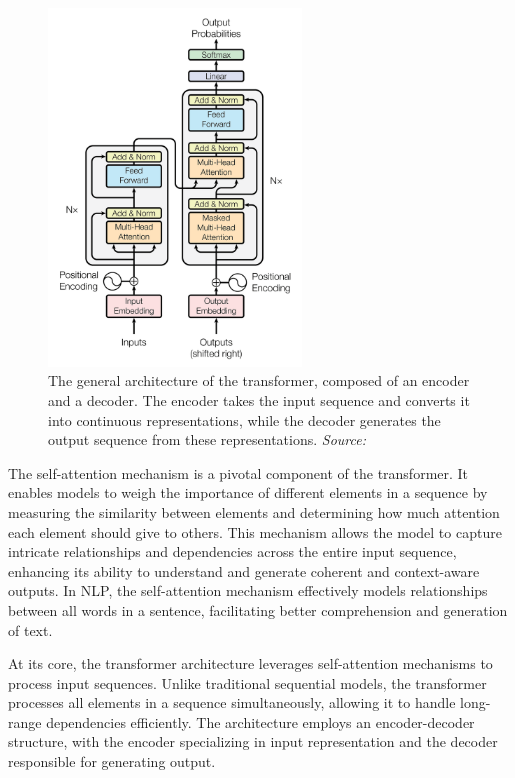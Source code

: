 \begin{figure}[h!]
    \centering
    \includegraphics[width=0.6\textwidth]{images/llms/transformer-architecture.png}
    \caption{The general architecture of the transformer, composed of an encoder and a decoder. The encoder takes the input sequence and converts it into continuous representations, while the decoder generates the output sequence from these representations. \textit{Source:} \cite{vaswani2017attention}}
    \label{fig:transformer-architecture}
\end{figure}

The self-attention mechanism is a pivotal component of the transformer. It enables models to weigh the importance of different elements in a sequence by measuring the similarity between elements and determining how much attention each element should give to others. This mechanism allows the model to capture intricate relationships and dependencies across the entire input sequence, enhancing its ability to understand and generate coherent and context-aware outputs. In NLP, the self-attention mechanism effectively models relationships between all words in a sentence, facilitating better comprehension and generation of text.

At its core, the transformer architecture leverages self-attention mechanisms to process input sequences. Unlike traditional sequential models, the transformer processes all elements in a sequence simultaneously, allowing it to handle long-range dependencies efficiently. The architecture employs an encoder-decoder structure, with the encoder specializing in input representation and the decoder responsible for generating output.

